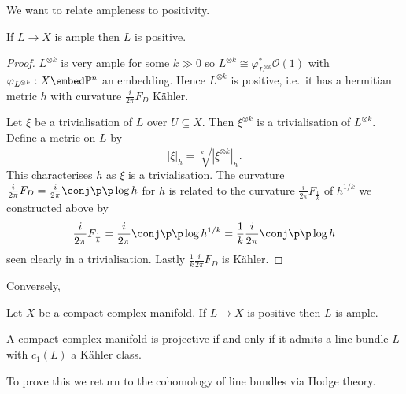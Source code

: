 \documentclass[a4paper]{article}
\renewcommand{\P}{\mathbb P} %
\begin{document}
We want to relate ampleness to positivity.
\begin{lemma}
  If \(L \to X\) is ample then \(L\) is positive.
\end{lemma}

\begin{proof}
  \(L^{\otimes k}\) is very ample for some \(k \gg 0\) so \(L^{\otimes k} \cong \varphi_{L^{\otimes k}}^* \mathcal O(1)\) with \(\varphi_{L^{\otimes k}}: X \embed \P^n\) an embedding. Hence \(L^{\otimes k}\) is positive, i.e.\ it has a hermitian metric \(h\) with curvature \(\frac{i}{2\pi} F_D\) Kähler.

  Let \(\xi\) be a trivialisation of \(L\) over \(U \subseteq X\). Then \(\xi^{\otimes k}\) is a trivialisation of \(L^{\otimes k}\). Define a metric on \(L\) by
  \[
    |\xi|_h = \sqrt[k]{|\xi^{\otimes k}|_h}.
  \]
  This characterises \(h\) as \(\xi\) is a trivialisation. The curvature \(\frac{i}{2\pi} F_D = \frac{i}{2\pi} \conj \p \p \log h\) for \(h\) is related to the curvature \(\frac{i}{2\pi} F_{\frac{1}{k}}\) of \(h^{1/k}\) we constructed above by
  \[
    \frac{i}{2\pi} F_{\frac{1}{k}}
    = \frac{i}{2\pi} \conj \p \p \log h^{1/k}
    = \frac{1}{k} \frac{i}{2\pi} \conj \p \p \log h
  \]
  seen clearly in a trivialisation. Lastly \(\frac{1}{k} \frac{i}{2\pi} F_D\) is Kähler.
\end{proof}

Conversely,
\begin{theorem}
  Let \(X\) be a compact complex manifold. If \(L \to X\) is positive then \(L\) is ample.
\end{theorem}

\begin{corollary}
  A compact complex manifold is projective if and only if it admits a line bundle \(L\) with \(c_1(L)\) a Kähler class.
\end{corollary}
To prove this we return to the cohomology of line bundles via Hodge theory.






 












\printindex
\end{document}
